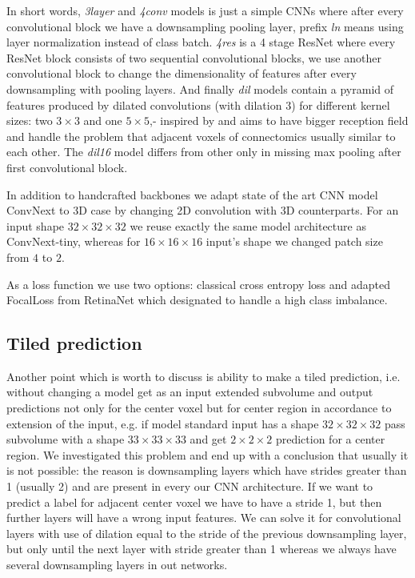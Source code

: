 \documentclass[twocolumn, a4paper]{article}
\theoremstyle{definition}
\begin{document}
In short words, \textit{3layer} and \textit{4conv} models is just a simple CNNs where
after every convolutional block we have a downsampling pooling layer, prefix \textit{ln} means using layer normalization
instead of class batch. \textit{4res} is a 4 stage ResNet where every ResNet block consists of
two sequential convolutional blocks, we use another convolutional block to change the dimensionality
of features after every downsampling with pooling layers. And finally \textit{dil} models contain
a pyramid of features produced by dilated convolutions (with dilation \( 3 \))
for different kernel sizes: two \( 3 \times 3 \) and one \( 5 \times 5 \),- inspired by \cite{chen2017deeplab} and aims to have bigger
reception field and handle the problem that adjacent voxels of connectomics usually similar to each other.
The \textit{dil16} model differs from other only in missing max pooling after first convolutional block.

In addition to handcrafted backbones we adapt state of the art CNN model ConvNext \cite{liu2022convnet} to 3D
case by changing 2D convolution with 3D counterparts. For an input shape \( 32 \times 32 \times 32 \) we
reuse exactly the same model architecture as ConvNext-tiny, whereas for \( 16 \times 16 \times 16 \) input's shape we
changed patch size from \( 4 \) to \(2 \).

As a loss function we use two options: classical cross entropy loss and adapted FocalLoss from
RetinaNet \cite{lin2017focal} which designated to handle a high class imbalance.

\subsection{Tiled prediction}
Another point which is worth to discuss is ability to make a tiled prediction,
i.e. without changing a model get as an input extended subvolume and output
predictions not only for the center voxel but for center region in accordance to extension of the input,
e.g. if model standard input has a shape \( 32 \times 32 \times 32 \) pass subvolume with a shape
\( 33 \times 33 \times 33 \) and get \( 2 \times 2 \times 2 \) prediction for a center region.
We investigated this problem and end up with a conclusion that usually it is not possible:
the reason is downsampling layers which have strides greater than 1 (usually 2) and are present in
every our CNN architecture. If we want to predict a label for adjacent center voxel we have
to have a stride 1, but then further layers will have a wrong input features. We can solve it for convolutional
layers with use of dilation equal to the stride of the previous downsampling layer, but only until the next layer
with stride greater than 1 whereas we always have several downsampling layers in out networks.
\end{document}
